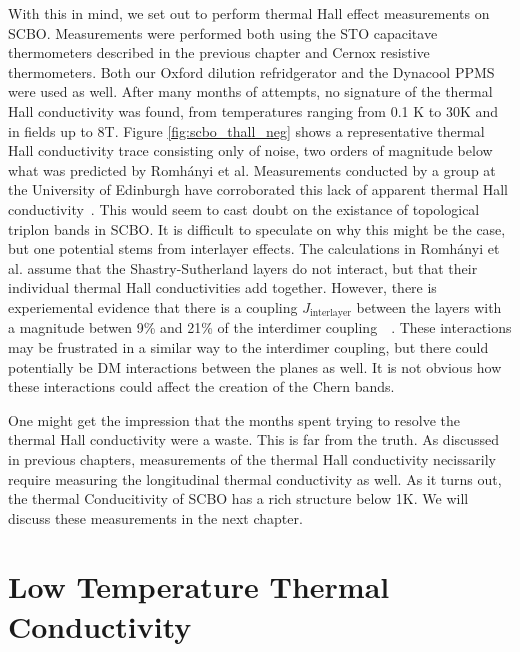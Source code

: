 \documentclass{thesis-umich}
\begin{document}
With this in mind, we set out to perform thermal Hall effect measurements on SCBO. Measurements were performed both using the STO capacitave thermometers described in the previous chapter and Cernox resistive thermometers. Both our Oxford dilution refridgerator and the Dynacool PPMS were used as well. After many months of attempts, no signature of the thermal Hall conductivity was found, from temperatures ranging from 0.1 K to 30K and in fields up to 8T. Figure \ref{fig:scbo_thall_neg} shows a representative thermal Hall conductivity trace consisting only of noise, two orders of magnitude below what was predicted by Romh\'{a}nyi et al. Measurements conducted by a group at the University of Edinburgh have corroborated this lack of apparent thermal Hall conductivity~\cite{CairnsMarchMeeting}. This would seem to cast doubt on the existance of topological triplon bands in SCBO. It is difficult to speculate on why this might be the case, but one potential stems from interlayer effects. The calculations in Romh\'{a}nyi et al. assume that the Shastry-Sutherland layers do not interact, but that their individual thermal Hall conductivities add together. However, there is experiemental evidence that there is a coupling $J_{\mathrm{interlayer}}$ between the layers with a magnitude betwen 9\% and 21\% of the interdimer coupling~\cite{Miyahara2000}~\cite{Knetter2000}. These interactions may be frustrated in a similar way to the interdimer coupling, but there could potentially be DM interactions between the planes as well. It is not obvious how these interactions could affect the creation of the Chern bands.

One might get the impression that the months spent trying to resolve the thermal Hall conductivity were a waste. This is far from the truth. As discussed in previous chapters, measurements of the thermal Hall conductivity necissarily require measuring the longitudinal thermal conductivity as well. As it turns out, the thermal Conducitivity of SCBO has a rich structure below 1K. We will discuss these measurements in the next chapter.

\section{Low Temperature Thermal Conductivity}
\end{document}

